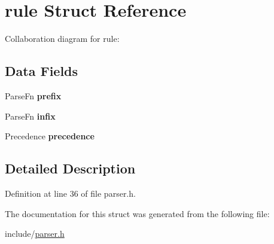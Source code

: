 \hypertarget{structrule}{}\section{rule Struct Reference}
\label{structrule}


Collaboration diagram for rule\+:
\subsection*{Data Fields}
\begin{DoxyCompactItemize}
\item 
\mbox{\label{structrule_a3da4be40064efcaf84c35f543f23ade1}} 
Parse\+Fn {\bfseries prefix}
\item 
\mbox{\label{structrule_a9c472711ebb36b437e03079a4338adec}} 
Parse\+Fn {\bfseries infix}
\item 
\mbox{\label{structrule_a510437452bbdc10c910d6e9d27161fcb}} 
Precedence {\bfseries precedence}
\end{DoxyCompactItemize}


\subsection{Detailed Description}


Definition at line 36 of file parser.\+h.



The documentation for this struct was generated from the following file\+:\begin{DoxyCompactItemize}
\item 
include/\hyperlink{parser_8h}{parser.\+h}\end{DoxyCompactItemize}
